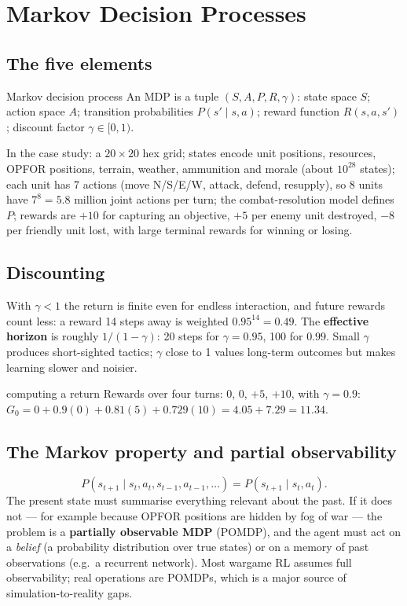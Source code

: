 \documentclass[11pt]{article}
\begin{document}
\section{Markov Decision Processes}
\subsection{The five elements}
\begin{definition}{Markov decision process}
An MDP is a tuple $(S,A,P,R,\gamma)$: state space $S$; action space $A$; transition probabilities $P(s'\mid s,a)$; reward function $R(s,a,s')$; discount factor $\gamma\in[0,1)$.
\end{definition}
In the case study: a $20\times20$ hex grid; states encode unit positions, resources, OPFOR positions, terrain, weather, ammunition and morale (about $10^{28}$ states); each unit has 7 actions (move N/S/E/W, attack, defend, resupply), so 8 units have $7^8=5.8$ million joint actions per turn; the combat-resolution model defines $P$; rewards are $+10$ for capturing an objective, $+5$ per enemy unit destroyed, $-8$ per friendly unit lost, with large terminal rewards for winning or losing.

\subsection{Discounting}
With $\gamma<1$ the return is finite even for endless interaction, and future rewards count less: a reward 14 steps away is weighted $0.95^{14}=0.49$. The \textbf{effective horizon} is roughly $1/(1-\gamma)$: 20 steps for $\gamma=0.95$, 100 for $0.99$. Small $\gamma$ produces short-sighted tactics; $\gamma$ close to 1 values long-term outcomes but makes learning slower and noisier.
\begin{example}{computing a return}
Rewards over four turns: 0, 0, $+5$, $+10$, with $\gamma=0.9$: $G_0=0+0.9(0)+0.81(5)+0.729(10)=4.05+7.29=11.34$.
\end{example}

\subsection{The Markov property and partial observability}
\[P(s_{t+1}\mid s_t,a_t,s_{t-1},a_{t-1},\ldots)=P(s_{t+1}\mid s_t,a_t).\]
The present state must summarise everything relevant about the past. If it does not --- for example because OPFOR positions are hidden by fog of war --- the problem is a \textbf{partially observable MDP} (POMDP), and the agent must act on a \emph{belief} (a probability distribution over true states) or on a memory of past observations (e.g.\ a recurrent network). Most wargame RL assumes full observability; real operations are POMDPs, which is a major source of simulation-to-reality gaps.
\end{document}
